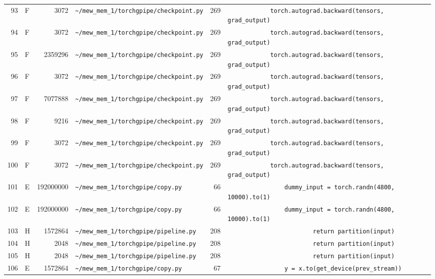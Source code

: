 \documentclass{article}
\begin{document}
\begin{longtable}{r l r p{6.5cm} r p{7.0cm}}
93 & F & 3072 & \lstinline|~/mew_mem_1/torchgpipe/checkpoint.py| & 269 & \lstinline|            torch.autograd.backward(tensors, grad_output)| \\
94 & F & 3072 & \lstinline|~/mew_mem_1/torchgpipe/checkpoint.py| & 269 & \lstinline|            torch.autograd.backward(tensors, grad_output)| \\
95 & F & 2359296 & \lstinline|~/mew_mem_1/torchgpipe/checkpoint.py| & 269 & \lstinline|            torch.autograd.backward(tensors, grad_output)| \\
96 & F & 3072 & \lstinline|~/mew_mem_1/torchgpipe/checkpoint.py| & 269 & \lstinline|            torch.autograd.backward(tensors, grad_output)| \\
97 & F & 7077888 & \lstinline|~/mew_mem_1/torchgpipe/checkpoint.py| & 269 & \lstinline|            torch.autograd.backward(tensors, grad_output)| \\
98 & F & 9216 & \lstinline|~/mew_mem_1/torchgpipe/checkpoint.py| & 269 & \lstinline|            torch.autograd.backward(tensors, grad_output)| \\
99 & F & 3072 & \lstinline|~/mew_mem_1/torchgpipe/checkpoint.py| & 269 & \lstinline|            torch.autograd.backward(tensors, grad_output)| \\
100 & F & 3072 & \lstinline|~/mew_mem_1/torchgpipe/checkpoint.py| & 269 & \lstinline|            torch.autograd.backward(tensors, grad_output)| \\
101 & E & 192000000 & \lstinline|~/mew_mem_1/torchgpipe/copy.py| & 66 & \lstinline|                dummy_input = torch.randn(4800, 10000).to(1)| \\
102 & E & 192000000 & \lstinline|~/mew_mem_1/torchgpipe/copy.py| & 66 & \lstinline|                dummy_input = torch.randn(4800, 10000).to(1)| \\
103 & H & 1572864 & \lstinline|~/mew_mem_1/torchgpipe/pipeline.py| & 208 & \lstinline|                        return partition(input)| \\
104 & H & 2048 & \lstinline|~/mew_mem_1/torchgpipe/pipeline.py| & 208 & \lstinline|                        return partition(input)| \\
105 & H & 2048 & \lstinline|~/mew_mem_1/torchgpipe/pipeline.py| & 208 & \lstinline|                        return partition(input)| \\
106 & E & 1572864 & \lstinline|~/mew_mem_1/torchgpipe/copy.py| & 67 & \lstinline|                y = x.to(get_device(prev_stream))| \\
\end{longtable}
\end{document}
